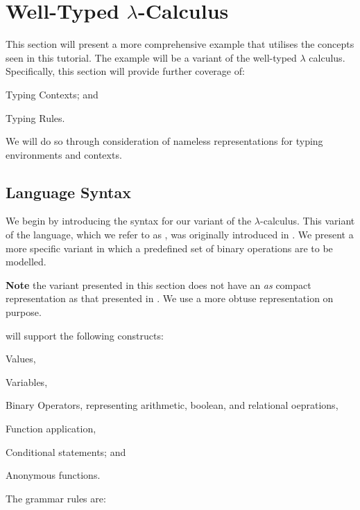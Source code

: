 \section{Well-Typed $\lambda$-Calculus}
\label{sec:lambda}


This section will present a more comprehensive example that utilises the concepts seen in this tutorial.
The example will be a variant of the well-typed $\lambda$ calculus.
Specifically, this section will provide further coverage of:
\begin{compactitem}
  \item Typing Contexts; and
  \item Typing Rules.
\end{compactitem}
We will do so through consideration of nameless representations for typing environments and contexts.

\subsection{Language Syntax}
\label{sec:lambda:syntax}

We begin by introducing the syntax for our variant of the $\lambda$-calculus.
This variant of the language, which we refer to as \lamlang{}, was originally introduced in \citet{Community2014}.
We present a more specific variant in which a predefined set of binary operations are to be modelled.

\textbf{Note} the variant presented in this section does not have an \emph{as} compact representation as that presented in \citet{Community2014}.
We use a more obtuse representation on purpose.

\lamlang{} will support the following constructs:
\begin{inparaenum}
  \item Values,
  \item Variables,
  \item Binary Operators, representing arithmetic, boolean, and relational oeprations,
  \item Function application,
  \item Conditional statements; and
  \item Anonymous functions.
\end{inparaenum}
The grammar rules are:

\begin{bnf}
\\
\\
\\
\\
\end{bnf}

